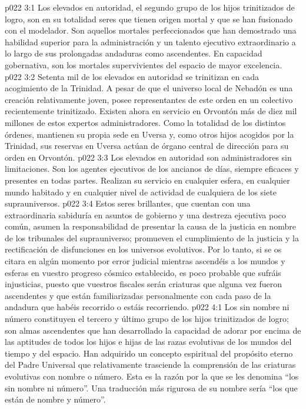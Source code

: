 \vs p022 3:1 Los elevados en autoridad, el segundo grupo de los hijos trinitizados de logro, son en su totalidad seres que tienen origen mortal y que se han fusionado con el modelador. Son aquellos mortales perfeccionados que han demostrado una habilidad superior para la administración y un talento ejecutivo extraordinario a lo largo de sus prolongadas andaduras como ascendentes. En capacidad gobernativa, son los mortales supervivientes del espacio de mayor excelencia.
\vs p022 3:2 Setenta mil de los elevados en autoridad se trinitizan en cada acogimiento de la Trinidad. A pesar de que el universo local de Nebadón es una creación relativamente joven, posee representantes de este orden en un colectivo recientemente trinitizado. Existen ahora en servicio en Orvontón más de diez mil millones de estos expertos administradores. Como la totalidad de los distintos órdenes, mantienen su propia sede en Uversa y, como otros hijos acogidos por la Trinidad, sus reservas en Uversa actúan de órgano central de dirección para su orden en Orvontón.
\vs p022 3:3 Los elevados en autoridad son administradores sin limitaciones. Son los agentes ejecutivos de los ancianos de días, siempre eficaces y presentes en todas partes. Realizan su servicio en cualquier esfera, en cualquier mundo habitado y en cualquier nivel de actividad de cualquiera de los siete suprauniversos.
\vs p022 3:4 Estos seres brillantes, que cuentan con una extraordinaria sabiduría en asuntos de gobierno y una destreza ejecutiva poco común, asumen la responsabilidad de presentar la causa de la justicia en nombre de los tribunales del suprauniverso; promueven el cumplimiento de la justicia y la rectificación de disfunciones en los universos evolutivos. Por lo tanto, si se os citara en algún momento por error judicial mientras ascendéis a los mundos y esferas en vuestro progreso cósmico establecido, es poco probable que sufráis injusticias, puesto que vuestros fiscales serán criaturas que alguna vez fueron ascendentes y que están familiarizadas personalmente con cada paso de la andadura que habéis recorrido o estáis recorriendo.
\vs p022 4:1 Los sin nombre ni número constituyen el tercero y último grupo de los hijos trinitizados de logro; son almas ascendentes que han desarrollado la capacidad de adorar por encima de las aptitudes de todos los hijos e hijas de las razas evolutivas de los mundos del tiempo y del espacio. Han adquirido un concepto espiritual del propósito eterno del Padre Universal que relativamente trasciende la comprensión de las criaturas evolutivas con nombre o número. Esta es la razón por la que se les denomina “los sin nombre ni número”. Una traducción más rigurosa de su nombre sería “los que están  de nombre y número”.
